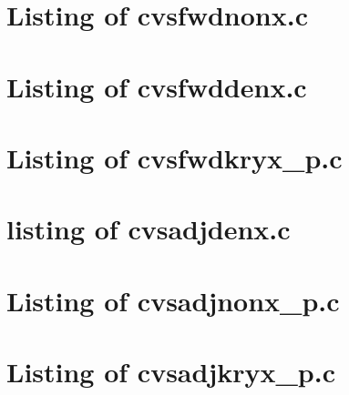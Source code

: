 
\lstset{language=C}

\newpage
\section{Listing of cvsfwdnonx.c}\label{s:cvsfwdnonx_c}

\newpage
\section{Listing of cvsfwddenx.c}\label{s:cvsfwddenx_c}

\newpage
\section{Listing of cvsfwdkryx\_p.c}\label{s:cvsfwdkryx_p_c}


\newpage
\section{listing of cvsadjdenx.c}\label{s:cvsadjdenx_c}

\newpage
\section{Listing of cvsadjnonx\_p.c}\label{s:cvsadjnonx_p_c}

\newpage
\section{Listing of cvsadjkryx\_p.c}\label{s:cvsadjkryx_p_c}

